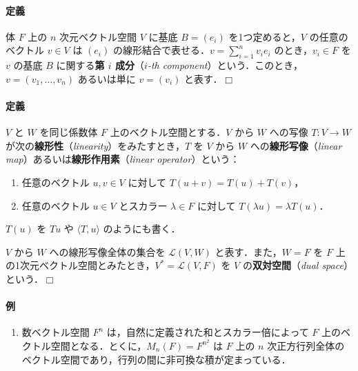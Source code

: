 \documentclass[10pt,b5paper,pandoc]{bxjsarticle}
\providecommand{\tightlist}{%
  \setlength{\itemsep}{0pt}\setlength{\parskip}{0pt}}
\let\oldparagraph\paragraph
\renewcommand{\paragraph}[1]{\oldparagraph{#1}\mbox{}}
\begin{document}
\hypertarget{components-of-vector-in-finite-dimensional-space}{%
\paragraph{定義}\label{components-of-vector-in-finite-dimensional-space}}

体 \(F\) 上の \(n\) 次元ベクトル空間 \(V\) に基底 \(B = (e_i)\)
を1つ定めると，\(V\) の任意のベクトル \(v \in V\) は \((e_i)\)
の線形結合で表せる．\(v = \sum_{i = 1}^n v_i e_i\) のとき，\(v_i \in F\)
を \(v\) の基底 \(B\) に関する\textbf{第 \(i\) 成分}（\emph{\(i\)-th
component}）という．このとき，\(v = (v_1, \dotsc, v_n)\) あるいは単に
\(v = (v_i)\) と表す．\(\Box\)

\hypertarget{linear-map}{%
\paragraph{定義}\label{linear-map}}

\(V\) と \(W\) を同じ係数体 \(F\) 上のベクトル空間とする．\(V\) から
\(W\) への写像 \(T \colon V \to W\)
が次の\textbf{線形性}（\emph{linearity}）をみたすとき，\(T\) を \(V\)
から \(W\) への\textbf{線形写像}（\emph{linear
map}）あるいは\textbf{線形作用素}（\emph{linear operator}）という：

\begin{enumerate}
\def\labelenumi{\arabic{enumi}.}
\tightlist
\item
  任意のベクトル \(u, v \in V\) に対して \(T(u + v) = T(u) + T(v)\)，
\item
  任意のベクトル \(u \in V\) とスカラー \(\lambda \in F\) に対して
  \(T(\lambda u) = \lambda T(u)\)．
\end{enumerate}

\(T(u)\) を \(Tu\) や \(\langle T, u \rangle\) のようにも書く．

\(V\) から \(W\) への線形写像全体の集合を \(\mathcal L(V, W)\)
と表す．また，\(W = F\) を \(F\)
上の1次元ベクトル空間とみたとき，\(V^* = \mathcal L(V, F)\) を \(V\)
の\textbf{双対空間}（\emph{dual space}）という．\(\Box\)

\hypertarget{ux4f8b}{%
\paragraph{例}\label{ux4f8b}}

\begin{enumerate}
\def\labelenumi{\roman{enumi})}
\tightlist
\item
  数ベクトル空間 \(F^n\) は，自然に定義された和とスカラー倍によって
  \(F\) 上のベクトル空間となる．とくに，\(M_n(F) = F^{n^2}\) は \(F\)
  上の \(n\)
  次正方行列全体のベクトル空間であり，行列の間に非可換な積が定まっている．
\end{enumerate}
\end{document}
